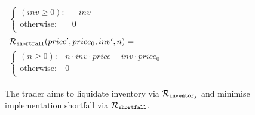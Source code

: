 \begin{itemize}
{\begin{tabular}{ll}
                \qquad $ \begin{cases}
                (inv \geq 0) : & -inv \\
                \text{otherwise} : & 0 \\
                \end{cases} $ & $ $ \\           
            $ \mathcal{R}_{\mathtt{shortfall}}(price', price_0, inv', n) = $ &  $ $ \\
                \qquad $ \begin{cases}
                (n \geq 0) : & n \cdot inv \cdot price - inv \cdot price_0 \\
                \text{otherwise} : & 0 \\
                \end{cases} $ & $ $ \\           
        \end{tabular}
    }    
\end{itemize}

The trader aims to liquidate inventory via {\footnotesize $ \mathcal{R}_{\mathtt{inventory}} $} and minimise implementation shortfall via {\footnotesize $ \mathcal{R}_{\mathtt{shortfall}} $}.

%    
